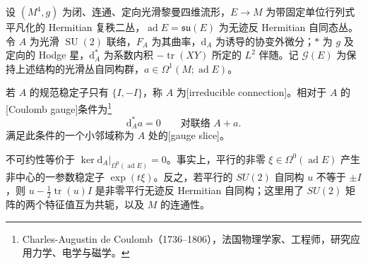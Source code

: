 \begin{definition}\label{g3:def:B-irreducible-coulomb}
	设 \((M^4,g)\) 为闭、连通、定向光滑黎曼四维流形，\(E\to M\) 为带固定单位行列式平凡化的 Hermitian 复秩二丛，\(\operatorname{ad}E=\mathfrak{su}(E)\) 为无迹反 Hermitian 自同态丛。
	令 \(A\) 为光滑 \(\operatorname{SU}(2)\) 联络，\(F_A\) 为其曲率，\(\mathrm d_A\) 为诱导的协变外微分；\(*\) 为 \(g\) 及定向的 Hodge 星，\(\mathrm d_A^*\) 为系数内积 \(-\operatorname{tr}(XY)\) 所定的 \(L^2\) 伴随。记 \(\mathcal G(E)\) 为保持上述结构的光滑丛自同构群，\(a\in\Omega^1(M;\operatorname{ad}E)\)。

 若 \(A\) 的规范稳定子只有 \(\{I,-I\}\)，称 \(A\) 为[irreducible connection]。相对于 \(A\) 的[Coulomb gauge]条件为\footnote{Charles-Augustin de Coulomb（1736--1806），法国物理学家、工程师，研究应用力学、电学与磁学。}
 \[
  \mathrm d_A^*a=0\qquad\text{对联络 }A+a.
 \]
 满足此条件的一个小邻域称为 \(A\) 处的[gauge slice]。
\end{definition}

不可约性等价于 \(\ker \mathrm d_A|_{\Omega^0(\operatorname{ad}E)}=0\)。事实上，平行的非零 \(\xi\in\Omega^0(\operatorname{ad}E)\) 产生非中心的一参数稳定子 \(\exp(t\xi)\)。反之，若平行的 \(SU(2)\) 自同构 \(u\) 不等于 \(\pm I\)，则
\(u-\tfrac12\operatorname{tr}(u)I\) 是非零平行无迹反 Hermitian 自同构；这里用了 \(SU(2)\) 矩阵的两个特征值互为共轭，以及 \(M\) 的连通性。

